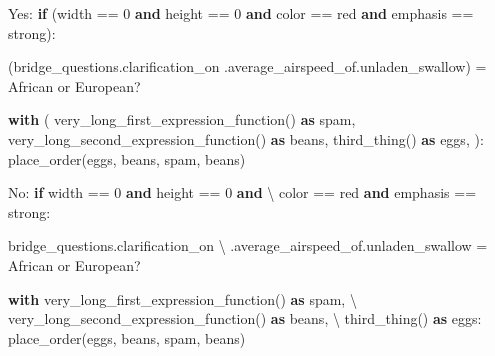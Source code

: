 \documentclass[
]{article}
\newenvironment{Shaded}{}{}
\newcommand{\ControlFlowTok}[1]{\textcolor[rgb]{0.00,0.44,0.13}{\textbf{#1}}}
\newcommand{\DecValTok}[1]{\textcolor[rgb]{0.25,0.63,0.44}{#1}}
\newcommand{\ImportTok}[1]{\textcolor[rgb]{0.00,0.50,0.00}{\textbf{#1}}}
\newcommand{\KeywordTok}[1]{\textcolor[rgb]{0.00,0.44,0.13}{\textbf{#1}}}
\newcommand{\NormalTok}[1]{#1}
\newcommand{\OperatorTok}[1]{\textcolor[rgb]{0.40,0.40,0.40}{#1}}
\newcommand{\StringTok}[1]{\textcolor[rgb]{0.25,0.44,0.63}{#1}}
\begin{document}
\begin{samepage}
\begin{Shaded}
\begin{Highlighting}[]

\NormalTok{Yes: }\ControlFlowTok{if}\NormalTok{ (width }\OperatorTok{==} \DecValTok{0} \KeywordTok{and}\NormalTok{ height }\OperatorTok{==} \DecValTok{0} \KeywordTok{and}
\NormalTok{         color }\OperatorTok{==} \StringTok{\textquotesingle{}red\textquotesingle{}} \KeywordTok{and}\NormalTok{ emphasis }\OperatorTok{==} \StringTok{\textquotesingle{}strong\textquotesingle{}}\NormalTok{):}

\NormalTok{     (bridge\_questions.clarification\_on}
\NormalTok{      .average\_airspeed\_of.unladen\_swallow) }\OperatorTok{=} \StringTok{\textquotesingle{}African or European?\textquotesingle{}}

     \ControlFlowTok{with}\NormalTok{ (}
\NormalTok{         very\_long\_first\_expression\_function() }\ImportTok{as}\NormalTok{ spam,}
\NormalTok{         very\_long\_second\_expression\_function() }\ImportTok{as}\NormalTok{ beans,}
\NormalTok{         third\_thing() }\ImportTok{as}\NormalTok{ eggs,}
\NormalTok{     ):}
\NormalTok{       place\_order(eggs, beans, spam, beans)}
\end{Highlighting}
\end{Shaded}
\end{samepage}

\begin{samepage}
\begin{Shaded}
\begin{Highlighting}[]

\NormalTok{No:  }\ControlFlowTok{if}\NormalTok{ width }\OperatorTok{==} \DecValTok{0} \KeywordTok{and}\NormalTok{ height }\OperatorTok{==} \DecValTok{0} \KeywordTok{and} \OperatorTok{\textbackslash{}}
\NormalTok{         color }\OperatorTok{==} \StringTok{\textquotesingle{}red\textquotesingle{}} \KeywordTok{and}\NormalTok{ emphasis }\OperatorTok{==} \StringTok{\textquotesingle{}strong\textquotesingle{}}\NormalTok{:}

\NormalTok{     bridge\_questions.clarification\_on }\OperatorTok{\textbackslash{}}
\NormalTok{         .average\_airspeed\_of.unladen\_swallow }\OperatorTok{=} \StringTok{\textquotesingle{}African or European?\textquotesingle{}}

     \ControlFlowTok{with}\NormalTok{ very\_long\_first\_expression\_function() }\ImportTok{as}\NormalTok{ spam, }\OperatorTok{\textbackslash{}}
\NormalTok{           very\_long\_second\_expression\_function() }\ImportTok{as}\NormalTok{ beans, }\OperatorTok{\textbackslash{}}
\NormalTok{           third\_thing() }\ImportTok{as}\NormalTok{ eggs:}
\NormalTok{       place\_order(eggs, beans, spam, beans)}
\end{Highlighting}
\end{Shaded}
\end{samepage}
\end{document}
